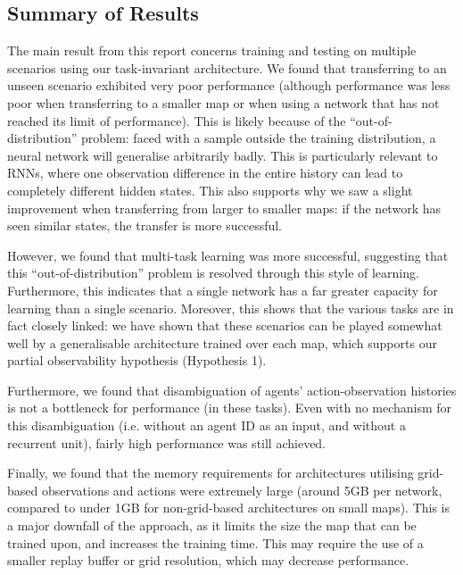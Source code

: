 \subsection{Summary of Results}

The main result from this report concerns training and testing on multiple scenarios using our task-invariant architecture. We found that transferring to an unseen scenario exhibited very poor performance (although performance was less poor when transferring to a smaller map or when using a network that has not reached its limit of performance). This is likely because of the ``out-of-distribution'' \cite{ood} problem: faced with a sample outside the training distribution, a neural network will generalise arbitrarily badly. This is particularly relevant to RNNs, where one observation difference in the entire history can lead to completely different hidden states. This also supports why we saw a slight improvement when transferring from larger to smaller maps: if the network has seen similar states, the transfer is more successful.



However, we found that multi-task learning was more successful, suggesting that this ``out-of-distribution'' problem is resolved through this style of learning. Furthermore, this indicates that a single network has a far greater capacity for learning than a single scenario. Moreover, this shows that the various tasks are in fact closely linked: we have shown that these scenarios can be played somewhat well by a generalisable architecture trained over each map, which supports our partial observability hypothesis (Hypothesis 1).

Furthermore, we found that disambiguation of agents' action-observation histories is not a bottleneck for performance (in these tasks). Even with no mechanism for this disambiguation (i.e. without an agent ID as an input, and without a recurrent unit), fairly high performance was still achieved.

Finally, we found that the memory requirements for architectures utilising grid-based observations and actions were extremely large (around 5GB per network, compared to under 1GB for non-grid-based architectures on small maps). This is a major downfall of the approach, as it limits the size the map that can be trained upon, and increases the training time. This may require the use of a smaller replay buffer or grid resolution, which may decrease performance.





